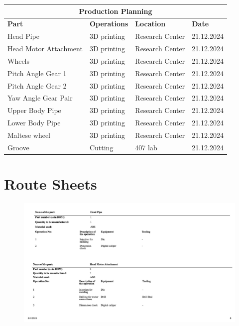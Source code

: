 \documentclass[12pt]{article}
\begin{document}
\begin{appendices}
\begin{center}
\begin{tabular}{|l|l|l|l|}
\hline
\multicolumn{4}{|c|}{\textbf{Production Planning}} \\ \hline
\textbf{Part}               & \textbf{Operations} & \textbf{Location} & \textbf{Date} \\ \hline
Head Pipe                  & 3D printing         & Research Center       & 21.12.2024    \\ \hline
Head Motor Attachment      & 3D printing         & Research Center       & 21.12.2024    \\ \hline
Wheels                     & 3D printing         & Research Center       & 21.12.2024    \\ \hline
Pitch Angle Gear 1         & 3D printing         & Research Center       & 21.12.2024    \\ \hline
Pitch Angle Gear 2         & 3D printing         & Research Center       & 21.12.2024    \\ \hline
Yaw Angle Gear Pair        & 3D printing         & Research Center       & 21.12.2024    \\ \hline
Upper Body Pipe            & 3D printing         & Research Center       & 21.12.2024    \\ \hline
Lower Body Pipe            & 3D printing         & Research Center       & 21.12.2024    \\ \hline
Maltese wheel              & 3D printing         & Research Center       & 21.12.2024    \\ \hline
Groove                     & Cutting             & 407 lab            & 21.12.2024          \\ \hline
\end{tabular}
\end{center}


\section{Route Sheets}

\begin{figure}[H]
    \centering
    \includegraphics[width=\textwidth]{Slide8.jpeg} 
    \label{fig:route-sheet}
\end{figure}


\end{appendices}
\end{document}
